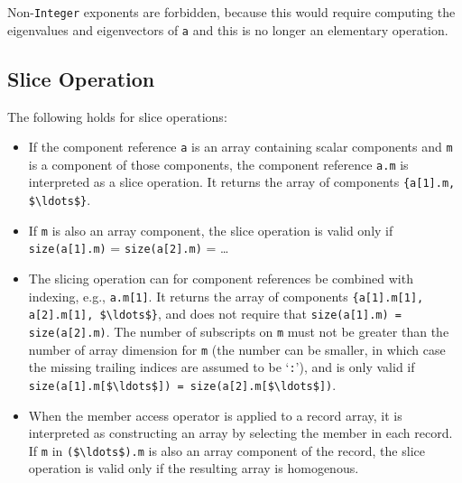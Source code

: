 \begin{nonnormative}
Non-\lstinline!Integer! exponents are forbidden, because this would require
computing the eigenvalues and eigenvectors of \lstinline!a! and this is no
longer an elementary operation.
\end{nonnormative}

\subsection{Slice Operation}\label{slice-operation}

The following holds for slice operations:
\begin{itemize}
\item
  If the component reference \lstinline!a! is an array containing scalar components and \lstinline!m! is a component of those components, the component reference \lstinline!a.m! is interpreted as a slice operation.
  It returns the array of components \lstinline!{a[1].m, $\ldots$}!.
\item
  If \lstinline!m! is also an array component, the slice operation is valid only if \lstinline!size(a[1].m)! = \lstinline!size(a[2].m)! = \ldots
\item
  The slicing operation can for component references be combined with indexing, e.g., \lstinline!a.m[1]!.
  It returns the array of components \lstinline!{a[1].m[1], a[2].m[1], $\ldots$}!, and does not require that \lstinline!size(a[1].m) = size(a[2].m)!.
  The number of subscripts on \lstinline!m! must not be greater than the number of array dimension for \lstinline!m! (the number can be smaller, in which case the missing trailing indices are assumed to be `\lstinline!:!'), and is only valid if \lstinline!size(a[1].m[$\ldots$]) = size(a[2].m[$\ldots$])!.
\item
  When the member access operator is applied to a record array, it is interpreted as constructing an array by selecting the member in each record.
  If \lstinline!m! in \lstinline!($\ldots$).m! is also an array component of the record, the slice operation is valid only if the resulting array is homogenous.
\end{itemize}

